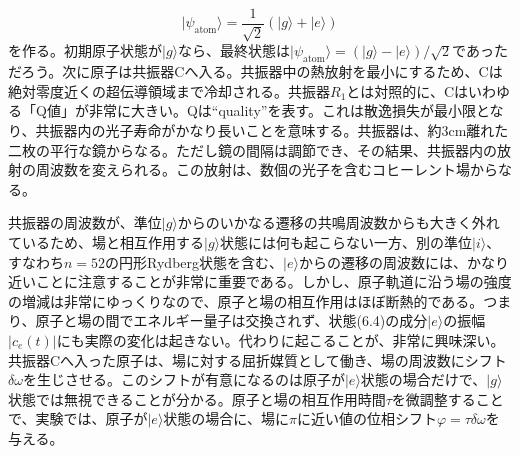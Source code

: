 \hypertarget{srcpage:249}{}\label{srcpage:249}
\begin{equation}
|\psi_{\mathrm{atom}}\rangle=\frac1{\sqrt2}(|g\rangle+|e\rangle)\tag{6.10}
\end{equation}
を作る。初期原子状態が$|g\rangle$なら、最終状態は$|\psi_{\mathrm{atom}}\rangle=(|g\rangle-|e\rangle)/\sqrt2$であっただろう。次に原子は共振器Cへ入る。共振器中の熱放射を最小にするため、Cは絶対零度近くの超伝導領域まで冷却される。共振器$R_1$とは対照的に、Cはいわゆる「Q値」が非常に大きい。Qは``quality''を表す。これは散逸損失が最小限となり、共振器内の光子寿命がかなり長いことを意味する。共振器は、約3cm離れた二枚の平行な鏡からなる。ただし鏡の間隔は調節でき、その結果、共振器内の放射の周波数を変えられる。この放射は、数個の光子を含むコヒーレント場からなる。

共振器の周波数が、準位$|g\rangle$からのいかなる遷移の共鳴周波数からも大きく外れているため、場と相互作用する$|g\rangle$状態には何も起こらない一方、別の準位$|i\rangle$、すなわち$n=52$の円形Rydberg状態を含む、$|e\rangle$からの遷移の周波数には、かなり近いことに注意することが非常に重要である。しかし、原子軌道に沿う場の強度の増減は非常にゆっくりなので、原子と場の相互作用はほぼ断熱的である。つまり、原子と場の間でエネルギー量子は交換されず、状態(6.4)の成分$|e\rangle$の振幅$|c_e(t)|$にも実際の変化は起きない。代わりに起こることが、非常に興味深い。共振器Cへ入った原子は、場に対する屈折媒質として働き、場の周波数にシフト$\delta\omega$を生じさせる。このシフトが有意になるのは原子が$|e\rangle$状態の場合だけで、$|g\rangle$状態では無視できることが分かる。原子と場の相互作用時間$\tau$を微調整することで、実験では、原子が$|e\rangle$状態の場合に、場に$\pi$に近い値の位相シフト$\varphi=\tau\delta\omega$を与える。

